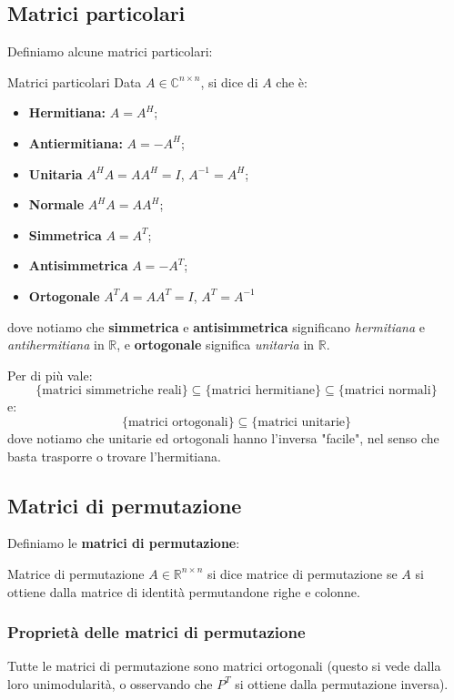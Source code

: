 \documentclass[a4paper,11pt]{article}
\begin{document}
\subsection{Matrici particolari}
Definiamo alcune matrici particolari:
\begin{definition}{Matrici particolari}
	Data $A \in \mathbb{C}^{n \times n}$, si dice di $A$ che è:
	\begin{itemize}
		\item \textbf{Hermitiana:} $A = A^H$; 
		\item \textbf{Antiermitiana:} $A = -A^H$;
		\item \textbf{Unitaria} $A^H A = A A^H = I$, $A^{-1} = A^H$;
		\item \textbf{Normale} $A^H A = A A^H$;
		\item \textbf{Simmetrica} $A = A^T$;
		\item \textbf{Antisimmetrica} $A = -A^T$;
		\item \textbf{Ortogonale} $A^TA = AA^T = I$, $A^T = A^{-1}$
	\end{itemize}
\end{definition}
dove notiamo che \textbf{simmetrica} e \textbf{antisimmetrica} significano \textit{hermitiana} e \textit{antihermitiana} in $\mathbb{R}$, e \textbf{ortogonale} significa \textit{unitaria} in $\mathbb{R}$.

Per di più vale:
$$
\{ \text{matrici simmetriche reali} \} \subseteq \{ \text{matrici hermitiane} \} \subseteq \{ \text{matrici normali} \}
$$
e:
$$\{ \text{matrici ortogonali} \} \subseteq \{ \text{matrici unitarie} \}
$$
dove notiamo che unitarie ed ortogonali hanno l'inversa "facile", nel senso che basta trasporre o trovare l'hermitiana.

\subsection{Matrici di permutazione}
Definiamo le \textbf{matrici di permutazione}:
\begin{definition}{Matrice di permutazione}
	$A \in \mathbb{R}^{n \times n}$ si dice matrice di permutazione se $A$ si ottiene dalla matrice di identità permutandone righe e colonne.
\end{definition}

\subsubsection{Proprietà delle matrici di permutazione}
Tutte le matrici di permutazione sono matrici ortogonali (questo si vede dalla loro unimodularità, o osservando che $P^T$ si ottiene dalla permutazione inversa).
\end{document}
